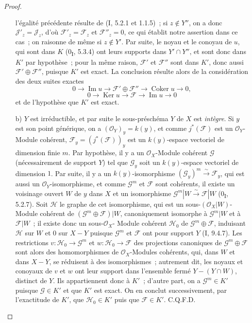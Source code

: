 \begin{proof}
\begin{enumerate}
l'égalité précédente résulte de (I, 5.2.1 et 1.1.5)~; si $z\notin Y''$, on a
donc $\mathcal J'_z=\mathcal J_z$, d'où $\mathcal F'_z=\mathcal F_z$ et
$\mathcal F''_z=0$, ce qui établit notre assertion dans ce cas~; on raisonne
de même si $z\notin Y'$. Par suite, le noyau et le conoyau de $u$, qui sont
dans $K$ (0\textsubscript{I}, 5.3.4) ont leurs supports dans $Y'\cap Y''$,
et sont donc dans $K'$ par hypothèse~; pour la même raison, $\mathcal F'$ et
$\mathcal F''$ sont dans $K'$, donc aussi $\mathcal F'\oplus\mathcal F''$,
puisque $K'$ est exact. La conclusion résulte alors de la considération des
deux suites exactes
\[
0\longrightarrow\operatorname{Im}u\longrightarrow
\mathcal F'\oplus\mathcal F''\longrightarrow
\operatorname{Coker}u\longrightarrow0,
\]
\[
0\longrightarrow\operatorname{Ker}u\longrightarrow\mathcal F
\longrightarrow\operatorname{Im}u\longrightarrow0
\]
et de l'hypothèse que $K'$ est exact.

\item[b)] $Y$ est irréductible, et par suite le sous-préschéma $Y$ de $X$ est
\emph{intègre}. Si $y$ est son point générique, on a
$(\mathcal O_Y)_y=k(y)$, et comme $j^*(\mathcal F)$ est un
$\mathcal O_Y$-Module cohérent, $\mathcal F_y=(j^*(\mathcal F))_y$ est un
$k(y)$-espace vectoriel de dimension finie $m$. Par hypothèse, il y a un
$\mathcal O_X$-Module cohérent $\mathcal G$ (nécessairement de support $Y$)
tel que $\mathcal G_y$ soit un $k(y)$-espace vectoriel de dimension $1$. Par
suite, il y a un $k(y)$-isomorphisme
$(\mathcal G_y)^m\xrightarrow{\sim}\mathcal F_y$, qui est aussi un
$\mathcal O_Y$-isomorphisme, et comme $\mathcal G^m$ et $\mathcal F$ sont
cohérents, il existe un voisinage ouvert $W$ de $y$ dans $X$ et un
isomorphisme $\mathcal G^m|W\xrightarrow{\sim}\mathcal F|W$
(0\textsubscript{I}, 5.2.7). Soit $\mathcal H$ le graphe de cet isomorphisme,
qui est un sous-$(\mathcal O_X|W)$-Module cohérent de
$(\mathcal G^m\oplus\mathcal F)|W$, canoniquement isomorphe à
$\mathcal G^m|W$ et à $\mathcal F|W$~; il existe donc un sous-$\mathcal O_X$-
Module cohérent $\mathcal H_0$ de $\mathcal G^m\oplus\mathcal F$, induisant
$\mathcal H$ sur $W$ et $0$ sur $X-Y$ puisque $\mathcal G^m$ et
$\mathcal F$ ont pour support $Y$ (I, 9.4.7). Les restrictions
$v:\mathcal H_0\to\mathcal G^m$ et $w:\mathcal H_0\to\mathcal F$ des
projections canoniques de $\mathcal G^m\oplus\mathcal F$ sont alors des
homomorphismes de $\mathcal O_X$-Modules cohérents, qui, dans $W$ et dans
$X-Y$, se réduisent à des isomorphismes~; autrement dit, les noyaux et
conoyaux de $v$ et $w$ ont leur support dans l'ensemble fermé
$Y-(Y\cap W)$, distinct de $Y$. Ils appartiennent donc à $K'$~; d'autre
part, on a $\mathcal G^m\in K'$ puisque $\mathcal G\in K'$ et que $K'$ est
exact. On en conclut successivement, par l'exactitude de $K'$, que
$\mathcal H_0\in K'$ puis que $\mathcal F\in K'$. C.Q.F.D.
\end{enumerate}
\end{proof}

